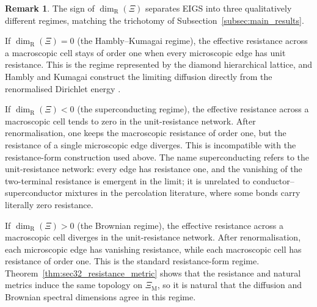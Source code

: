 \documentclass{article}
\theoremstyle{plain}
\theoremstyle{definition}
\newtheorem{remark}[theorem]{Remark}
\newcommand{\dimresis}{\dim_\mathrm{R}}
\begin{document}
\begin{remark}\label{rem:three_resistance_regimes}
The sign of $\dimresis(\Xi)$ separates EIGS into three qualitatively different regimes, matching the trichotomy of Subsection~\ref{subsec:main_results}.

If $\dimresis(\Xi)=0$ (the Hambly--Kumagai regime), the effective resistance across a macroscopic cell stays of order one when every microscopic edge has unit resistance.
This is the regime represented by the diamond hierarchical lattice, and Hambly and Kumagai construct the limiting diffusion directly from the renormalised Dirichlet energy \cite{hambly2010diffusion}.

If $\dimresis(\Xi)<0$ (the superconducting regime), the effective resistance across a macroscopic cell tends to zero in the unit-resistance network.
After renormalisation, one keeps the macroscopic resistance of order one, but the resistance of a single microscopic edge diverges.
This is incompatible with the resistance-form construction used above.
The name superconducting refers to the unit-resistance network: every edge has resistance one, and the vanishing of the two-terminal resistance is emergent in the limit; it is unrelated to conductor--superconductor mixtures in the percolation literature, where some bonds carry literally zero resistance.

If $\dimresis(\Xi)>0$ (the Brownian regime), the effective resistance across a macroscopic cell diverges in the unit-resistance network.
After renormalisation, each microscopic edge has vanishing resistance, while each macroscopic cell has resistance of order one.
This is the standard resistance-form regime.
Theorem~\ref{thm:sec32_resistance_metric} shows that the resistance and natural metrics induce the same topology on $\Xi_{\mathrm M}$, so it is natural that the diffusion and Brownian spectral dimensions agree in this regime.
\end{remark}
\end{document}
